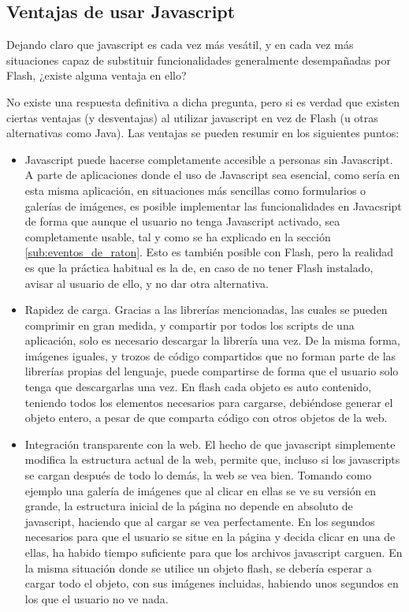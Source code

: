 \subsection{Ventajas de usar Javascript} %
\label{sub:ventajas_de_usar_javascript}

Dejando claro que javascript es cada vez más vesátil, y en cada vez más situaciones capaz de substituir funcionalidades generalmente desempañadas por Flash, ¿existe alguna ventaja en ello?

No existe una respuesta definitiva a dicha pregunta, pero si es verdad que existen ciertas ventajas (y desventajas) al utilizar javascript en vez de Flash (u otras alternativas como Java). Las ventajas se pueden resumir en los siguientes puntos:

\begin{itemize}
  \item Javascript puede hacerse completamente accesible a personas sin Javascript. A parte de aplicaciones donde el uso de Javascript sea esencial, como sería en esta misma aplicación, en situaciones más sencillas como formularios o galerías de imágenes, es posible implementar las funcionalidades en Javacsript de forma que aunque el usuario no tenga Javascript activado, sea completamente usable, tal y como se ha explicado en la sección \ref{sub:eventos_de_raton}. Esto es también posible con Flash, pero la realidad es que la práctica habitual es la de, en caso de no tener Flash instalado, avisar al usuario de ello, y no dar otra alternativa.
  \item Rapidez de carga. Gracias a las librerías mencionadas, las cuales se pueden comprimir en gran medida, y compartir por todos los scripts de una aplicación, solo es necesario descargar la librería una vez. De la misma forma, imágenes iguales, y trozos de código compartidos que no forman parte de las librerías propias del lenguaje, puede compartirse de forma que el usuario solo tenga que descargarlas una vez. En flash cada objeto es auto contenido, teniendo todos los elementos necesarios para cargarse, debiéndose generar el objeto entero, a pesar de que comparta código con otros objetos de la web.
  \item Integración transparente con la web. El hecho de que javascript simplemente modifica la estructura actual de la web, permite que, incluso si los javascripts se cargan después de todo lo demás, la web se vea bien. Tomando como ejemplo una galería de imágenes que al clicar en ellas se ve su versión en grande, la estructura inicial de la página no depende en absoluto de javascript, haciendo que al cargar se vea perfectamente. En los segundos necesarios para que el usuario se situe en la página y decida clicar en una de ellas, ha habido tiempo suficiente para que los archivos javascript carguen. En la misma situación donde se utilice un objeto flash, se debería esperar a cargar todo el objeto, con sus imágenes incluidas, habiendo unos segundos en los que el usuario no ve nada.
\end{itemize}

